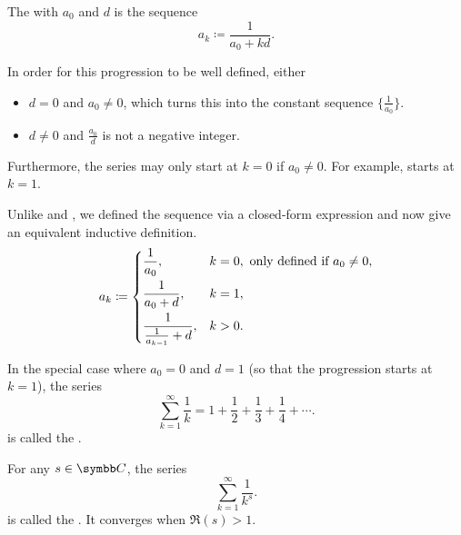 \begin{definition}\label{def:harmonic_progression}
  The  with  \( a_0 \) and  \( d \) is the sequence
  \begin{equation*}
    a_k \coloneqq \frac 1 {a_0 + kd}.
  \end{equation*}

  \begin{defenum}
     In order for this progression to be well defined, either
    \begin{itemize}
      \item \( d = 0 \) and \( a_0 \neq 0 \), which turns this into the constant sequence \( \{ \tfrac 1 {a_0} \} \).

      \item \( d \neq 0 \) and \( \frac {a_0} d \) is not a negative integer.
    \end{itemize}

    Furthermore, the series may only start at \( k = 0 \) if \( a_0 \neq 0 \). For example,  starts at \( k = 1 \).

     Unlike  and , we defined the sequence via a closed-form expression and now give an equivalent inductive definition. \begin{equation*}
      a_k \coloneqq \begin{dcases}
        \frac 1 {a_0}, &k = 0, \text{ only defined if } a_0 \neq 0, \\
        \frac 1 {a_0 + d}, &k = 1, \\
        \frac 1 {\frac 1 {a_{k-1}} + d}, &k > 0.
      \end{dcases}
    \end{equation*}

     In the special case where \( a_0 = 0 \) and \( d = 1 \) (so that the progression starts at \( k = 1 \)), the series
    \begin{equation}\label{def:harmonic_progression/harmonic_series}
      \sum_{k=1}^\infty \frac 1 k = 1 + \frac 1 2 + \frac 1 3 + \frac 1 4 + \cdots.
    \end{equation}
    is called the .

     For any \( s \in \BC \), the series
    \begin{equation*}
      \sum_{k=1}^\infty \frac 1 {k^s}.
    \end{equation*}
    is called the . It converges when \( \Re(s) > 1 \).
  \end{defenum}
\end{definition}
